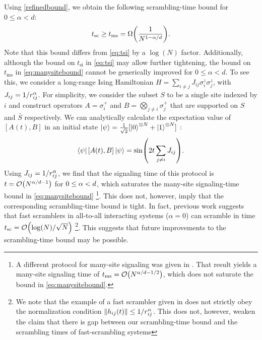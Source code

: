 Using \cref{refinedbound}, we obtain the following scrambling-time bound for $0\le\alpha<d$:
\begin{equation}
    \label{eq:manysitebound}
    t_\text{sc}\ge t_\text{ms}= \W{ \frac{1}{N^{1-\al/d}}}.
\end{equation}
Note that this bound differs from \cref{eq:tsi} by a $\log(N)$ factor.
Additionally, although the bound on $t_\text{si}$ in \cref{eq:tsi} may allow further tightening, the bound on $t_\text{ms}$ in \cref{eq:manysitebound} cannot be generically improved for $0\le\alpha<d$.
To see this, we consider a long-range Ising Hamiltonian $H=\sum_{i\neq j}J_{ij}\sigma_{i}^{z}\sigma_{j}^{z}$, with $J_{ij}=1/r_{ij}^{\alpha}$.
For simplicity, we consider the subset $S$ to be a single site indexed by $i$ and construct operators $A=\sigma_{i}^{+}$ and $B=\bigotimes_{j\ne i}\sigma_{j}^{+}$ that are supported on $S$ and $\bar{S}$ respectively.
We can analytically calculate the expectation value of $[A(t),B]$ in an initial state $\left | \psi \right\rangle=\frac{1}{\sqrt{2}}[\left | 0 \right\rangle^{\otimes N}+\left | 1 \right\rangle^{\otimes N}]$ \cite{Gong2017}:
\begin{equation}
    \label{eq:manysiteprotocol}
\left \langle \psi \right |[A(t),B]\left | \psi \right\rangle=\sin(2t\sum_{j\ne i}J_{ij}).
\end{equation}
Using $J_{ij}=1/r_{ij}^{\alpha}$, we find that the signaling time of this protocol is $t=\O{N^{\al/d-1}}$ for $0\le\alpha<d$, which saturates the many-site signaling-time bound in \cref{eq:manysitebound} \footnote{A different protocol for many-site signaling was given in \cite{Eisert13}. That result yields a many-site signaling time of $t_\text{ms} =\O{N^{\al/d-1/2}}$, which does not saturate the bound in \cref{eq:manysitebound}.}.
This does not, however, imply that the corresponding scrambling-time bound is tight.
In fact, previous work suggests that fast scramblers in all-to-all interacting systems ($\alpha=0$) can scramble in time $t_\text{sc}=\O{\log(N)/\sqrt{N}}$ \cite{Lashkari2013}
\footnote{We note that the example of a fast scrambler given in \cite{Lashkari2013} does not strictly obey the normalization condition $\left\|h_{ij}(t)\right\|\le 1/r_{ij}^{\alpha}$. This does not, however,
 weaken the claim that there is gap between our scrambling-time bound and the scrambling times of fast-scrambling systems}.
This suggests that future improvements to the scrambling-time bound may be possible.

